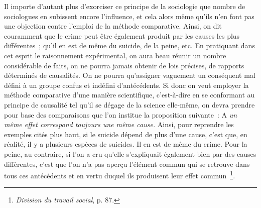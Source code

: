 \documentclass[french,twoside]{book} %
\begin{document}
Il importe d’autant plus d’exorciser ce principe de la sociologie que nombre de sociologues en subissent encore l’influence, et cela alors même qu’ils n’en font pas une objection contre l’emploi de la méthode comparative. Ainsi, on dit couramment que le crime peut être également produit par les causes les plus différentes ; qu’il en est de même du suicide, de la peine, etc. En pratiquant dans cet esprit le raisonnement expérimental, on aura beau réunir un nombre considérable de faits, on ne pourra jamais obtenir de lois précises, de rapports déterminés de causalités. On ne pourra qu’assigner vaguement un conséquent mal défini à un groupe confus et indéfini d’antécédents. Si donc on veut employer la méthode comparative d’une manière scientifique, c’est-à-dire en se conformant au principe de causalité tel qu’il se dégage de la science elle-même, on devra prendre pour base des comparaisons que l’on institue la proposition suivante : A {\itshape un même effet correspond toujours une même cause.} Ainsi, pour reprendre les exemples cités plus haut, si le suicide dépend de plus d’une cause, c’est que, en réalité, il y a plusieurs espèces de suicides. Il en est de même du crime. Pour la peine, au contraire, si l’on a cru qu’elle s’expliquait également bien par des causes différentes, c’est que l’on n’a pas aperçu l’élément commun qui se retrouve dans tous ces antécédents et en vertu duquel ils produisent leur effet commun \footnote{\emph{Division du travail social}, p. 87.}.
\end{document}
